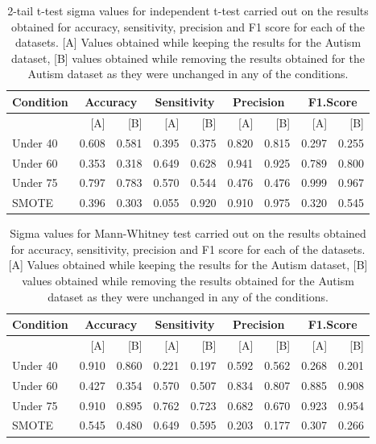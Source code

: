 \begin{table}[!htbp]
\centering
\begin{tabular}{lrrrrrrrr}
  \hline
  \rowcolor{LightCyan}
Condition &\multicolumn{2}{c}{Accuracy} &\multicolumn{2}{c}{Sensitivity} &\multicolumn{2}{c}{Precision}&\multicolumn{2}{c}{F1.Score}\\
  \hline
           & [A]  & [B]   & [A]   & [B]   & [A]   & [B]   & [A]   & [B] \\
 Under 40  &0.608 & 0.581 & 0.395 & 0.375 & 0.820 & 0.815 & 0.297 & 0.255 \\ 
  Under 60 &0.353 & 0.318 & 0.649 & 0.628 & 0.941 & 0.925 & 0.789 & 0.800 \\ 
  Under 75 &0.797 & 0.783 & 0.570 & 0.544 & 0.476 & 0.476 & 0.999 & 0.967 \\ 
  SMOTE    &0.396 & 0.303 & 0.055 & 0.920 & 0.910 & 0.975 & 0.320 & 0.545 \\
\hline
\end{tabular}
\caption{2-tail t-test sigma values for independent t-test carried out on the results obtained for accuracy, sensitivity, precision and F1 score for each of the datasets. [A] Values obtained while keeping the results for the Autism dataset, [B] values obtained while removing the results obtained for the Autism dataset as they were unchanged in any of the conditions.}
\label{tab: t-test}
\end{table}


\begin{table}[!htbp]
\centering
\begin{tabular}{lrrrrrrrr}
  \hline
  \rowcolor{LightCyan}
Condition &\multicolumn{2}{c}{Accuracy} &\multicolumn{2}{c}{Sensitivity} &\multicolumn{2}{c}{Precision}&\multicolumn{2}{c}{F1.Score}\\
  \hline
           & [A] & [B] & [A] & [B] & [A] & [B] & [A] & [B] \\
Under 40  &0.910& 0.860& 0.221 & 0.197 & 0.592 & 0.562 & 0.268 & 0.201 \\ 
  Under 60 &0.427& 0.354& 0.570 & 0.507 & 0.834 & 0.807 & 0.885 & 0.908 \\ 
  Under 75 &0.910&0.895 & 0.762 & 0.723 & 0.682 & 0.670 & 0.923 & 0.954 \\ 
  SMOTE &  0.545 & 0.480& 0.649 & 0.595  & 0.203 &0.177 & 0.307 & 0.266 \\
   \hline
\end{tabular}
\caption{Sigma values for Mann-Whitney test carried out on the results obtained for accuracy, sensitivity, precision and F1 score for each of the datasets. [A] Values obtained while keeping the results for the Autism dataset, [B] values obtained while removing the results obtained for the Autism dataset as they were unchanged in any of the conditions.}
\label{tab:MannWhiteney}
\end{table}
 

